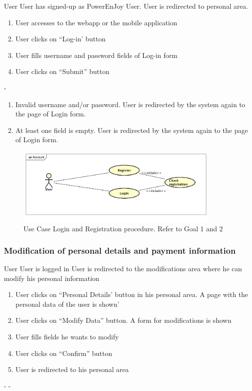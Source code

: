 {User}
{}
{User has signed-up as PowerEnJoy User.}
{User is redirected to personal area.}
{
	\begin{enumerate}
		\item User accesses to the webapp or the mobile application
		\item User clicks on ``Log-in' button
		\item User fills username and password fields of Log-in form
		\item User clicks on ``Submit'' button
	\end{enumerate}
}
{-}
{
	\begin{enumerate}
		\item Invalid username and/or password. User is redirected by the system again to the page of Login form.
		\item At least one field is empty. User is redirected by the system again to the page of Login form.
	\end{enumerate}
}

\begin{figure}[h]

	\includegraphics[width=380px]{img/usecase_login_registration}
	\caption{Use Case Login and Registration procedure. Refer to Goal 1 and 2}
\end{figure}
\pagebreak


\subsubsection{Modification of personal details and payment information}
{User}
{}
{User is logged in}
{User is redirected to the modifications area where he can modify his personal information}
{
\begin{enumerate}
	\item User clicks on ``Personal Details' button in his personal area. A page with the personal data of the user is shown'
	\item User clicks on ``Modify Data'' button. A form for modifications is shown
	\item User fills fields he wants to modify
	\item User clicks on ``Confirm'' button
	\item User is redirected to his personal area
\end{enumerate}
}
{-}
{-}
\pagebreak


